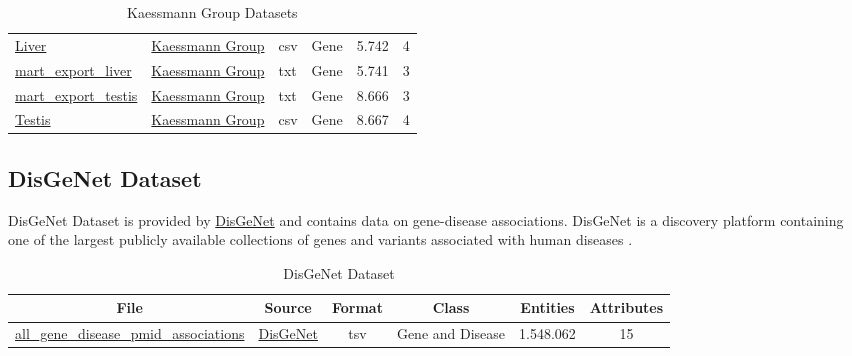 \begin{table}[!ht]
\begin{footnotesize}
\begin{tabularx}{\textwidth}{|l|l|l|l|l|l|}
	\href{https://nahorgebre.s3.amazonaws.com/Liver.csv}{Liver} & \href{https://www.zmbh.uni-heidelberg.de/kaessmann/}{Kaessmann Group}  & csv & Gene & 5.742 & 4 \\
	
	\href{https://nahorgebre.s3.amazonaws.com/mart_export_liver.txt}{mart\_export\_liver} & \href{https://www.zmbh.uni-heidelberg.de/kaessmann/}{Kaessmann Group} & txt & Gene & 5.741 & 3 \\
	
	\href{https://nahorgebre.s3.amazonaws.com/mart_export_testis.txt}{mart\_export\_testis} & \href{https://www.zmbh.uni-heidelberg.de/kaessmann/}{Kaessmann Group} & txt & Gene & 8.666 & 3 \\
	
	\href{https://nahorgebre.s3.amazonaws.com/Testis.csv}{Testis} & \href{https://www.zmbh.uni-heidelberg.de/kaessmann/}{Kaessmann Group}  & csv & Gene & 8.667 & 4 \\
	
  \hline
\end{tabularx}
\end{footnotesize}
\caption{Kaessmann Group Datasets}
\end{table}

\subsection{DisGeNet Dataset}
\label{disgenetds}
DisGeNet Dataset is provided by \href{https://www.disgenet.org/}{DisGeNet} and contains data on gene-disease associations. DisGeNet is a discovery platform containing one of the largest publicly available collections of genes and variants associated with human diseases \cite{Piero2019TheDK}.
 
\begin{table}[!ht]
\setlength\extrarowheight{2pt} %
\begin{footnotesize}
\begin{tabularx}{\textwidth}{|C|C|C|C|C|C|}
\hline
\textbf{File} & \textbf{Source} & \textbf{Format} & \textbf{Class} & \textbf{Entities} & \textbf{Attributes}  \\\hline

	\href{https://nahorgebre.s3.amazonaws.com/all_gene_disease_pmid_associations.tsv}{all\_gene\_disease\_pmid\_associations} & \href{https://www.disgenet.org/}{DisGeNet}  & tsv & Gene and Disease & 1.548.062 & 15 \\
  \hline
\end{tabularx}
\end{footnotesize}
\caption{DisGeNet Dataset}
\end{table}

